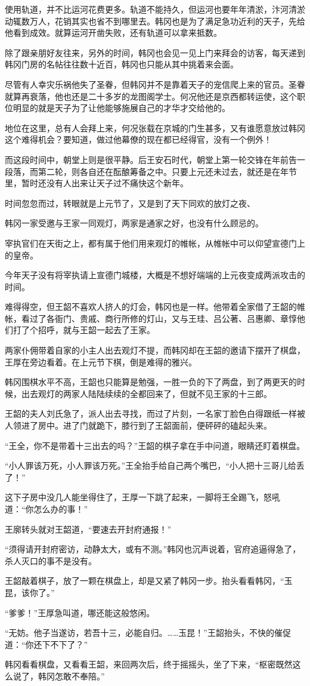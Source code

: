 使用轨道，并不比运河花费更多。轨道不能持久，但运河也要年年清淤，汴河清淤动辄数万人，花销其实也省不到哪里去。韩冈也是为了满足急功近利的天子，先给他看到成效。就算运河开凿失败，还有轨道可以拿来抵数。

除了跟亲朋好友往来，另外的时间，韩冈也会见一见上门来拜会的访客，每天递到韩冈门房的名帖往往数十近百，韩冈也只能从其中挑着来会面。

尽管有人幸灾乐祸他失了圣眷，但韩冈并不是靠着天子的宠信爬上来的官员。圣眷就算再衰落，他也还是二十多岁的龙图阁学士。何况他还是京西都转运使，这个职位明显的就是天子为了让他能够施展自己的才华才交给他的。

地位在这里，总有人会拜上来，何况张载在京城的门生甚多，又有谁愿意放过韩冈这个难得机会？要知道，做过他幕僚的现在都已经得官，没有一个例外！

而这段时间中，朝堂上则是很平静。后王安石时代，朝堂上第一轮交锋在年前告一段落，而第二轮，则各自还在酝酿筹备之中。只要上元还未过去，就还是在年节里，暂时还没有人出来让天子过不痛快这个新年。

时间忽忽而过，转眼就是上元节了，又是到了天下同欢的放灯之夜、

韩冈一家受邀与王家一同观灯，两家是通家之好，也没有什么顾忌的。

宰执官们在天街之上，都有属于他们用来观灯的帷帐，从帷帐中可以仰望宣德门上的皇帝。

今年天子没有将宰执请上宣德门城楼，大概是不想好端端的上元夜变成两派攻击的时间。

难得得空，但王韶不喜欢人挤人的灯会，韩冈也是一样。他带着全家借了王韶的帷帐，看过了各衙门、贵戚、商行所修的灯山，又与王珪、吕公著、吕惠卿、章惇他们打了个招呼，就与王韶一起去了王家。

两家仆佣带着自家的小主人出去观灯不提，而韩冈却在王韶的邀请下摆开了棋盘，王厚在旁边看着。在上元节下棋，倒是难得的雅兴。

韩冈围棋水平不高，王韶也只能算是勉强，一胜一负的下了两盘，到了两更天的时候，出去观灯的两家人陆陆续续的全都回来了，但就不见王家的十三郎。

王韶的夫人刘氏急了，派人出去寻找，而过了片刻，一名家丁脸色白得跟纸一样被人领进了房中。进了门就跪下，膝行到了王韶面前，便砰砰的磕起头来。

“王全，你不是带着十三出去的吗？”王韶的棋子拿在手中问道，眼睛还盯着棋盘。

“小人罪该万死，小人罪该万死。”王全抬手给自己两个嘴巴，“小人把十三哥儿给丢了！”

这下子房中没几人能坐得住了，王厚一下跳了起来，一脚将王全踢飞，怒吼道：“你怎么办的事！”

王廓转头就对王韶道，“要速去开封府通报！”

“须得请开封府密访，动静太大，或有不测。”韩冈也沉声说着，官府追逼得急了，杀人灭口的事不是没有。

王韶敲着棋子，放了一颗在棋盘上，却是又紧了韩冈一步。抬头看看韩冈，“玉昆，该你了。”

“爹爹！”王厚急叫道，哪还能这般悠闲。

“无妨。他子当遂访，若吾十三，必能自归。……玉昆！”王韶抬头，不快的催促道：“你还下不下了？”

韩冈看看棋盘，又看看王韶，来回两次后，终于摇摇头，坐了下来，“枢密既然这么说了，韩冈怎敢不奉陪。”

